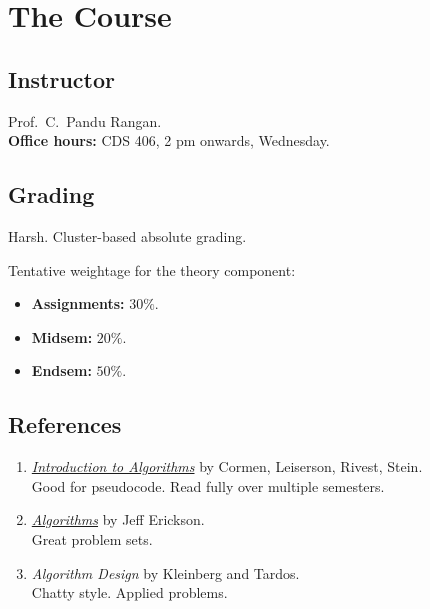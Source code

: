 \section{The Course} \label{sec:course}
\subsection{Instructor} \label{sec:instructor}
Prof.~C.~Pandu Rangan. \\
\textbf{Office hours:} CDS 406, 2 pm onwards, Wednesday.

\subsection{Grading} \label{sec:grading}
Harsh.
Cluster-based absolute grading.

Tentative weightage for the theory component:
\begin{itemize}
    \item \textbf{Assignments:} $30\%$.
    \item \textbf{Midsem:} $20\%$.
    \item \textbf{Endsem:} $50\%$.
\end{itemize}

\subsection{References} \label{sec:references}
\begin{enumerate}
    \item \href{https://dl.ebooksworld.ir/books/Introduction.to.Algorithms.4th.Leiserson.Stein.Rivest.Cormen.MIT.Press.9780262046305.EBooksWorld.ir.pdf}
        {\textsl{Introduction to Algorithms}}
        by Cormen, Leiserson, Rivest, Stein. \\
        Good for pseudocode.
        Read fully over multiple semesters.
    \item \href{https://jeffe.cs.illinois.edu/teaching/algorithms/}
        {\textsl{Algorithms}}
        by Jeff Erickson. \\
        Great problem sets.
    \item \textsl{Algorithm Design} by Kleinberg and Tardos. \\
        Chatty style.
        Applied problems.
\end{enumerate}

